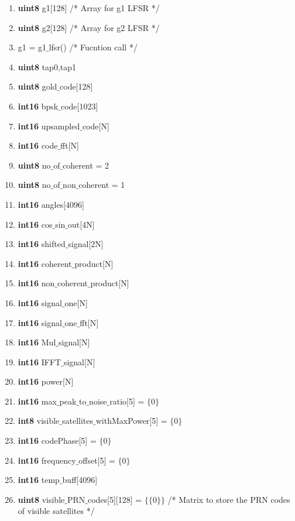 \documentclass[journal,10pt,onecolumn]{article}
\begin{document}
\begin{itemize}
\begin{enumerate}
    \item[] \textbf{uint8} g1[128]   \hspace{5mm} /*  Array for g1 LFSR */
    \item[] \textbf{uint8} g2[128]   \hspace{5mm} /* Array for g2 LFSR */
    \item[] g1 =  g1$\_$lfsr()       \hspace{5mm} /* Fucntion call */
    \item[] \textbf{uint8} tap0,tap1
    \item[] \textbf{uint8} gold$\_$code[128] 
    \item[] \textbf{int16} bpsk$\_$code[1023]
    \item[] \textbf{int16} upsampled$\_$code[N]
    \item[] \textbf{int16} code$\_$fft[N]
    \item[] \textbf{uint8} no$\_$of$\_$coherent = 2
    \item[] \textbf{uint8} no$\_$of$\_$non$\_$coherent = 1
    \item[] \textbf{int16} angles[4096]
    \item[] \textbf{int16} cos$\_$sin$\_$out[4N]
    \item[] \textbf{int16} shifted$\_$signal[2N]
    \item[] \textbf{int16}  coherent$\_$product[N]
    \item[] \textbf{int16} non$\_$coherent$\_$product[N]
    \item[] \textbf{int16} signal$\_$one[N]
    \item[] \textbf{int16} signal$\_$one$\_$fft[N]
    \item[] \textbf{int16} Mul$\_$signal[N]
    \item[] \textbf{int16} IFFT$\_$signal[N]
    \item[] \textbf{int16} power[N]
    \item[] \textbf{int16} max$\_$peak$\_$to$\_$noise$\_$ratio[5] = $\{0\}$ 
    \item[] \textbf{int8} visible$\_$satellites$\_$withMaxPower[5] = $\{0\}$
    \item[] \textbf{int16} codePhase[5] = $\{0\}$
    \item[] \textbf{int16} frequency$\_$offset[5] = $\{0\}$
    \item[] \textbf{int16} temp$\_$buff[4096]
    \item[] \textbf{uint8} visible$\_$PRN$\_$codes[5][128] = $\{\{0\}\}$  \hspace{5mm} /* Matrix to store the PRN codes of visible satellites */ 

\end{enumerate}
\end{itemize}
\end{document}
